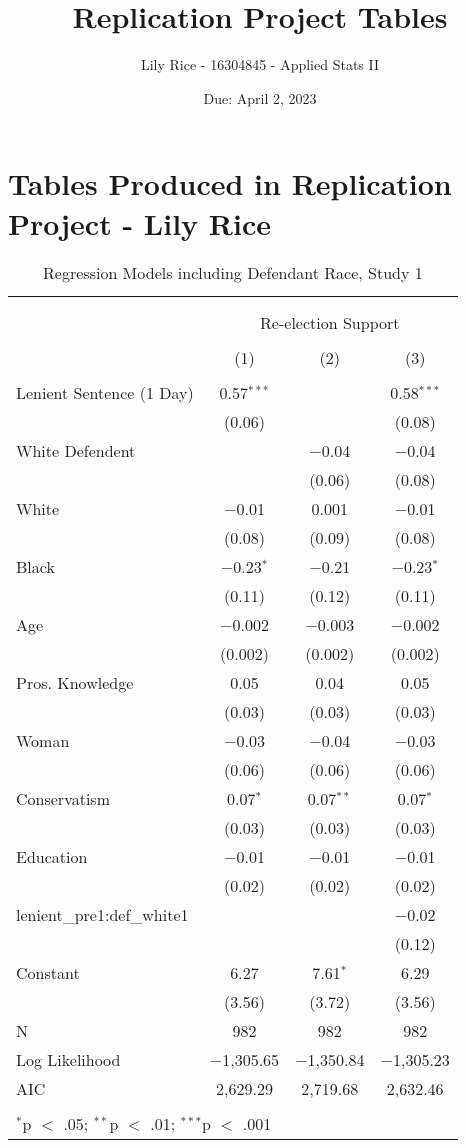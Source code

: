 \documentclass[12pt,letterpaper]{article}
\title{Replication Project Tables}
\date{Due: April 2, 2023}
\author{Lily Rice - 16304845 - Applied Stats II}
\begin{document}
	\maketitle
	\section*{Tables Produced in Replication Project - Lily Rice}
\begin{table}[!htbp] \centering   \caption{Regression Models including Defendant Race, Study 1}   \label{} \begin{tabular}{@{\extracolsep{5pt}}lccc} \\[-1.8ex]\hline \\[-1.8ex] \\[-1.8ex] & \multicolumn{3}{c}{Re-election Support} \\ \\[-1.8ex] & (1) & (2) & (3)\\ \hline \\[-1.8ex]  Lenient Sentence (1 Day) & 0.57$^{***}$ &  & 0.58$^{***}$ \\   & (0.06) &  & (0.08) \\   White Defendent &  & $-$0.04 & $-$0.04 \\   &  & (0.06) & (0.08) \\   White & $-$0.01 & 0.001 & $-$0.01 \\   & (0.08) & (0.09) & (0.08) \\   Black & $-$0.23$^{*}$ & $-$0.21 & $-$0.23$^{*}$ \\   & (0.11) & (0.12) & (0.11) \\   Age & $-$0.002 & $-$0.003 & $-$0.002 \\   & (0.002) & (0.002) & (0.002) \\   Pros. Knowledge & 0.05 & 0.04 & 0.05 \\   & (0.03) & (0.03) & (0.03) \\   Woman & $-$0.03 & $-$0.04 & $-$0.03 \\   & (0.06) & (0.06) & (0.06) \\   Conservatism & 0.07$^{*}$ & 0.07$^{**}$ & 0.07$^{*}$ \\   & (0.03) & (0.03) & (0.03) \\   Education & $-$0.01 & $-$0.01 & $-$0.01 \\   & (0.02) & (0.02) & (0.02) \\   lenient\_pre1:def\_white1 &  &  & $-$0.02 \\   &  &  & (0.12) \\   Constant & 6.27 & 7.61$^{*}$ & 6.29 \\   & (3.56) & (3.72) & (3.56) \\  N & 982 & 982 & 982 \\ Log Likelihood & $-$1,305.65 & $-$1,350.84 & $-$1,305.23 \\ AIC & 2,629.29 & 2,719.68 & 2,632.46 \\ \hline \\[-1.8ex] \multicolumn{4}{l}{$^{*}$p $<$ .05; $^{**}$p $<$ .01; $^{***}$p $<$ .001} \\ \end{tabular} \end{table}
\end{document}
